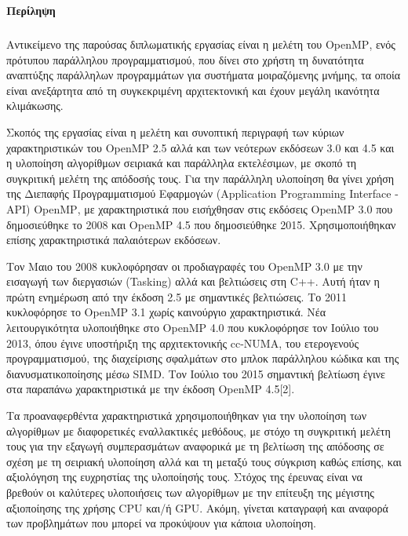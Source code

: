 \documentclass[12pt]{article}
\newcommand{\en}[1]{\foreignlanguage{english}{#1}}
\begin{document}

\clearpage
\begin{small}
\vfil
\end{small}



\clearpage
\begin{flushleft}
{\large \textbf{Περίληψη}}\\[0.5 cm]
\end{flushleft}

\subparagraph{}
Αντικείμενο της παρούσας διπλωματικής εργασίας είναι η μελέτη του \en{OpenMP}, ενός πρότυπου παράλληλου προγραμματισμού, που δίνει στο χρήστη τη δυνατότητα αναπτύξης παράλληλων προγραμμάτων για συστήματα μοιραζόμενης μνήμης, τα οποία  είναι ανεξάρτητα από τη συγκεκριμένη αρχιτεκτονική και έχουν μεγάλη ικανότητα κλιμάκωσης\cite{pdplab}.

Σκοπός της εργασίας είναι η μελέτη και συνοπτική περιγραφή των κύριων χαρακτηριστικών του \en{OpenMP 2.5} αλλά και των νεότερων εκδόσεων 3.0 και 4.5 και η υλοποίηση αλγορίθμων σειριακά και παράλληλα εκτελέσιμων, με σκοπό τη συγκριτική μελέτη της απόδοσής τους. Για την παράλληλη υλοποίηση θα γίνει χρήση της Διεπαφής Προγραμματισμού Εφαρμογών \en{(Application Programming Interface {-} API) OpenMP}, με χαρακτηριστικά που εισήχθησαν στις εκδόσεις \en{OpenMP} 3.0 που δημοσιεύθηκε το 2008 και \en{OpenMP} 4.5 που δημοσιεύθηκε 2015. Χρησιμοποιήθηκαν επίσης χαρακτηριστικά παλαιότερων εκδόσεων\cite{thenextstep}.

Τον Μαιο του 2008 κυκλοφόρησαν οι προδιαγραφές του \en{OpenMP} 3.0 με την εισαγωγή των διεργασιών \en{(Tasking)} αλλά και βελτιώσεις στη \en{C++}. Αυτή ήταν η πρώτη ενημέρωση από την έκδοση 2.5 με σημαντικές βελτιώσεις. Το 2011 κυκλοφόρησε το \en{OpenMP} 3.1 χωρίς καινούργιο χαρακτηριστικά. Νέα λειτουργικότητα υλοποιήθηκε στο \en{OpenMP} 4.0 που κυκλοφόρησε τον Ιούλιο του 2013, όπου έγινε υποστήριξη της αρχιτεκτονικής \en{cc-NUMA}, του ετερογενούς προγραμματισμού, της διαχείρισης σφαλμάτων στο μπλοκ παράλληλου κώδικα και της διανυσματικοποίησης μέσω \en{SIMD}. Τον Ιούλιο του 2015 σημαντική βελτίωση έγινε στα παραπάνω χαρακτηριστικά με την έκδοση \en{OpenMP} 4.5[2].

Τα προαναφερθέντα χαρακτηριστικά χρησιμοποιήθηκαν για την υλοποίηση των αλγορίθμων 
με διαφορετικές εναλλακτικές μεθόδους, με στόχο τη συγκριτική μελέτη τους για την εξαγωγή συμπερασμάτων αναφορικά με τη βελτίωση της απόδοσης σε σχέση με τη σειριακή υλοποίηση αλλά και τη μεταξύ τους σύγκριση καθώς επίσης, και αξιολόγηση της ευχρηστίας της υλοποίησής τους. Στόχος της έρευνας είναι να βρεθούν οι καλύτερες υλοποιήσεις των αλγορίθμων με την επίτευξη της μέγιστης αξιοποίησης της χρήσης \en{CPU} και/ή \en{GPU}. Ακόμη, γίνεται καταγραφή και αναφορά των προβλημάτων που μπορεί να προκύψουν για κάποια υλοποίηση.
\end{document}
